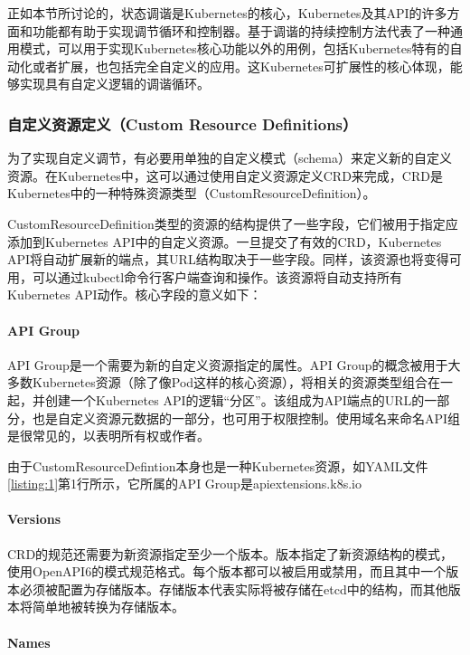 \documentclass[macfonts,master]{njuthesis}
\begin{document}
正如本节所讨论的，状态调谐是Kubernetes的核心，Kubernetes及其API的许多方面和功能都有助于实现调节循环和控制器。基于调谐的持续控制方法代表了一种通用模式，可以用于实现Kubernetes核心功能以外的用例，包括Kubernetes特有的自动化或者扩展，也包括完全自定义的应用。这Kubernetes可扩展性的核心体现，能够实现具有自定义逻辑的调谐循环。

\subsubsection{自定义资源定义（Custom Resource Definitions）}

为了实现自定义调节，有必要用单独的自定义模式（schema）来定义新的自定义资源。在Kubernetes中，这可以通过使用自定义资源定义CRD来完成，CRD是Kubernetes中的一种特殊资源类型（CustomResourceDefinition）。

CustomResourceDefinition类型的资源的结构提供了一些字段，它们被用于指定应添加到Kubernetes API中的自定义资源。一旦提交了有效的CRD，Kubernetes API将自动扩展新的端点，其URL结构取决于一些字段。同样，该资源也将变得可用，可以通过kubectl命令行客户端查询和操作。该资源将自动支持所有Kubernetes API动作。核心字段的意义如下：

\paragraph{API Group}

API Group是一个需要为新的自定义资源指定的属性。API Group的概念被用于大多数Kubernetes资源（除了像Pod这样的核心资源），将相关的资源类型组合在一起，并创建一个Kubernetes API的逻辑``分区''。该组成为API端点的URL的一部分，也是自定义资源元数据的一部分，也可用于权限控制。使用域名来命名API组是很常见的，以表明所有权或作者。

由于CustomResourceDefintion本身也是一种Kubernetes资源，如YAML文件\ref{listing:1}第1行所示，它所属的API Group是apiextensions.k8s.io

\paragraph{Versions}

CRD的规范还需要为新资源指定至少一个版本。版本指定了新资源结构的模式，使用OpenAPI6的模式规范格式。每个版本都可以被启用或禁用，而且其中一个版本必须被配置为存储版本。存储版本代表实际将被存储在etcd中的结构，而其他版本将简单地被转换为存储版本。

\paragraph{Names}
\end{document}
